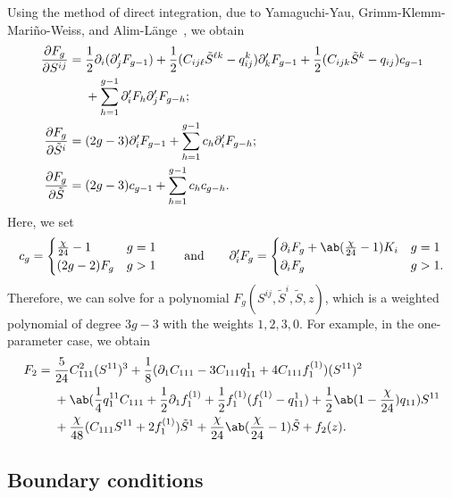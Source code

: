 \documentclass[10pt,oldfontcommands,oneside]{memoir}
\theoremstyle{definition}
\theoremstyle{remark}
\theoremstyle{plain}
\theoremstyle{definition}
\theoremstyle{remark}
\newcommand{\1}{\mathbf{1}}
\newcommand{\2}{\mathbf{2}}
\newcommand{\3}{\mathbf{3}}
\begin{document}
Using the method of direct integration, due to Yamaguchi-Yau, Grimm-Klemm-Mari\~{n}o-Weiss, and Alim-L\"ange~\cite{yy04,gkmw,alimlange}, we obtain
\begin{align*}
    \pdv{F_g}{S^{ij}} ={}& \frac{1}{2} \partial_i (\partial_j' F_{g-1}) +\frac{1}{2} (C_{ij\ell}\tilde{S}^{\ell k} - q_{ij}^k) \partial_k' F_{g-1} + \frac{1}{2} (C_{ijk}\tilde{S}^k - q_{ij}) c_{g-1} \\
    &+ \sum_{h=1}^{g-1} \partial_i' F_h \partial_j' F_{g-h}; \\
    \pdv{F_g}{\tilde{S}^i} ={}& (2g-3) \partial_i' F_{g-1} + \sum_{h=1}^{g-1} c_h \partial_i' F_{g-h}; \\
    \pdv{F_g}{\tilde{S}} ={}& (2g-3) c_{g-1} + \sum_{h=1}^{g-1} c_h c_{g-h}.
\end{align*}
Here, we set
\[ c_g = \begin{cases}
    \frac{\chi}{24}-1 & g=1 \\
    (2g-2) F_g & g > 1
\end{cases} \qquad  \text{and} \qquad \partial_i' F_g = \begin{cases}
    \partial_i F_g + \ab(\frac{\chi}{24}-1)K_i & g=1 \\
    \partial_i F_g & g > 1.
\end{cases}
\]
Therefore, we can solve for a polynomial $F_g(S^{ij}, \tilde{S}^i, \tilde{S}, z)$, which is a weighted polynomial of degree $3g-3$ with the weights $1,2,3,0$. For example, in the one-parameter case, we obtain
\begin{align*}
    F_2 ={}& \frac{5}{24} C_{111}^2 (S^{11})^3 + \frac{1}{8}(\partial_1 C_{111} - 3 C_{111}q_{11}^1 + 4 C_{111} f_1^{(1)})(S^{11})^2 \\
    &+ \ab(\frac{1}{4} q_1^{11} C_{111} + \frac{1}{2}\partial_1 f_1^{(1)} +\frac{1}{2} f_1^{(1)}(f_1^{(1)}- q_{11}^1) + \frac{1}{2} \ab(1-\frac{\chi}{24})q_{11})S^{11} \\
    &+ \frac{\chi}{48}(C_{111}S^{11}+2f_1^{(1)})\tilde{S}^1 + \frac{\chi}{24}\ab(\frac{\chi}{24}-1)\tilde{S} + f_2(z).
\end{align*}


\subsection{Boundary conditions}%
\label{sub:Boundary conditions}
\end{document}
